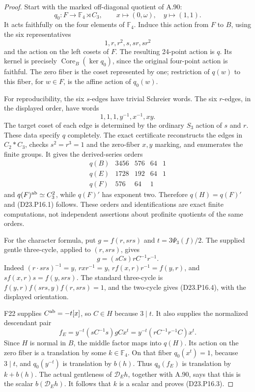 \begin{proof}
Start with the marked off-diagonal quotient of A.90:
\[
 q_0:F\longrightarrow \mathbb F_4\rtimes C_3,
 \qquad x\longmapsto(0,\omega),\quad y\longmapsto(1,1).
\]
It acts faithfully on the four elements of $\mathbb F_4$.
Induce this action from $F$ to $B$, using the six representatives
\[
 1,r,r^2,s,sr,sr^2
\]
and the action on the left cosets of $F$. The resulting
24-point action is $q$. Its kernel is precisely
$\operatorname{Core}_B(\ker q_0)$, since the original four-point
action is faithful. The zero fiber is the coset represented by
one; restriction of $q(w)$ to this fiber, for $w\in F$, is
the affine action of $q_0(w)$.

For reproducibility, the six $s$-edges have trivial Schreier
words. The six $r$-edges, in the displayed order, have words
\[
 1,1,1,y^{-1},x^{-1},xy.
\]
The target coset of each edge is determined by the ordinary
$S_3$ action of $s$ and $r$. These data specify $q$ completely.
The exact certificate reconstructs the edges in $C_2*C_3$, checks
$s^2=r^3=1$ and the zero-fiber $x,y$ marking, and enumerates
the finite groups. It gives the derived-series orders
\[
\begin{array}{c|rrrr}
 q(B)&3456&576&64&1\\
 q(E)&1728&192&64&1\\
 q(F)&576&64&1&
\end{array}
\]
and $q(F)^{\rm ab}\simeq C_3^2$, while $q(F)'$ has exponent
two. Therefore $q(H)=q(F)'$ and (D23.P16.1) follows.
These orders and identifications are exact finite computations,
not independent assertions about profinite quotients of the same
orders.

For the character formula, put $g=f(r,srs)$ and
$t=3\Psi_3(f)/2$. The supplied gentle three-cycle, applied to
$(r,srs)$, gives
\[
 g=(sCs)rC^{-1}r^{-1}.
 \tag{D23.P16.4}
\]
Indeed $(r\cdot srs)^{-1}=y$, $rxr^{-1}=y$,
$rf(x,r)r^{-1}=f(y,r)$, and
$sf(x,r)s=f(y,srs)$. The standard three-cycle is
$f(y,r)f(srs,y)f(r,srs)=1$, and the two-cycle gives
(D23.P16.4), with the displayed orientation.

F22 supplies $C^{\rm ab}=-t[x]$, so $C\in H$ because $3\mid t$.
It also supplies the normalized descendant pair
\[
 f_E=y^{-t}(sC^{-1}s)gC x^t
     =y^{-t}(rC^{-1}r^{-1}C)x^t.
 \tag{D23.P16.5}
\]
Since $H$ is normal in $B$, the middle factor maps into $q(H)$.
Its action on the zero fiber is a translation by some
$k\in\mathbb F_4$. On that fiber $q_0(x^t)=1$, because
$3\mid t$, and $q_0(y^{-t})$ is translation by $b(h)$.
Thus $q_0(f_E)$ is translation by $k+b(h)$. The actual
gentleness of $\mathcal D_E h$, together with A.90, says that
this is the scalar $b(\mathcal D_E h)$. It follows that $k$ is
a scalar and proves (D23.P16.3).


\end{proof}

